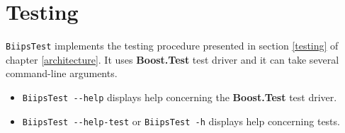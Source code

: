 \section{Testing}
\label{biipstest}

\texttt{BiipsTest} implements the testing procedure presented in section \ref{testing} of chapter \ref{architecture}. It uses \textbf{Boost.Test} test driver and it can take several command-line arguments.
\begin{itemize}
 \item \verb=BiipsTest --help= displays help concerning the \textbf{Boost.Test} test driver.
 \item \verb=BiipsTest --help-test= or \verb=BiipsTest -h= displays help concerning \biips{} tests.
\end{itemize}

